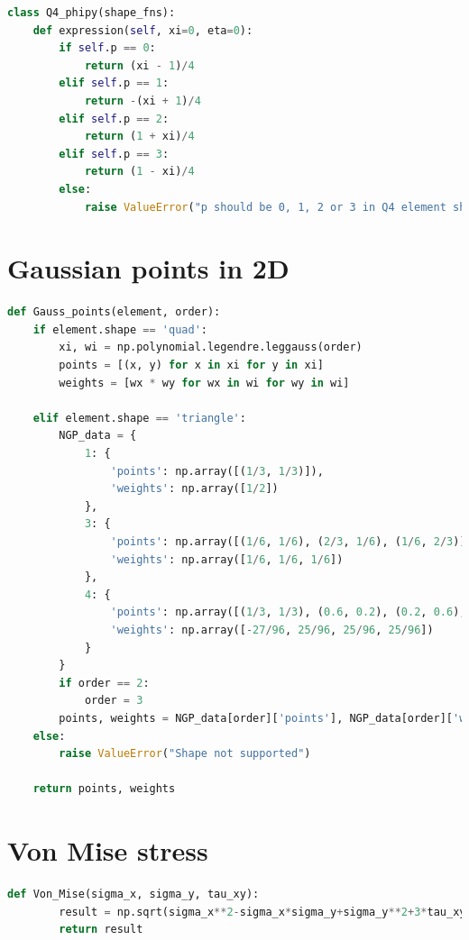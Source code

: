 \documentclass[twoside,twocolumn,10pt]{article}
\begin{document}
\begin{lstlisting}[language=Python, caption=Defeinitions of shape functions for T3 and Q4 elements]
class Q4_phipy(shape_fns):
    def expression(self, xi=0, eta=0):
        if self.p == 0:
            return (xi - 1)/4
        elif self.p == 1:
            return -(xi + 1)/4
        elif self.p == 2:
            return (1 + xi)/4
        elif self.p == 3:
            return (1 - xi)/4
        else:
            raise ValueError("p should be 0, 1, 2 or 3 in Q4 element shape functions, not {}".format(self.p))
\end{lstlisting}

\section{Gaussian points in 2D}
\label{Apdx:Gaussian_2D}
\begin{lstlisting}[language=Python, caption=Gaussian points in 2D]
  def Gauss_points(element, order):
    if element.shape == 'quad':
        xi, wi = np.polynomial.legendre.leggauss(order)
        points = [(x, y) for x in xi for y in xi]
        weights = [wx * wy for wx in wi for wy in wi]
        
    elif element.shape == 'triangle':
        NGP_data = {
            1: {
                'points': np.array([(1/3, 1/3)]),
                'weights': np.array([1/2])
            },
            3: {
                'points': np.array([(1/6, 1/6), (2/3, 1/6), (1/6, 2/3)]),
                'weights': np.array([1/6, 1/6, 1/6])
            },
            4: {
                'points': np.array([(1/3, 1/3), (0.6, 0.2), (0.2, 0.6), (0.2, 0.2)]),
                'weights': np.array([-27/96, 25/96, 25/96, 25/96])
            }
        }
        if order == 2:
            order = 3
        points, weights = NGP_data[order]['points'], NGP_data[order]['weights']
    else:
        raise ValueError("Shape not supported")

    return points, weights 
\end{lstlisting}


\section{Von Mise stress}
\label{Apdx:Von}
\begin{lstlisting}[language=Python, caption=Von Mise stress]
  def Von_Mise(sigma_x, sigma_y, tau_xy):
        result = np.sqrt(sigma_x**2-sigma_x*sigma_y+sigma_y**2+3*tau_xy**2)
        return result
\end{lstlisting}
\end{document}
